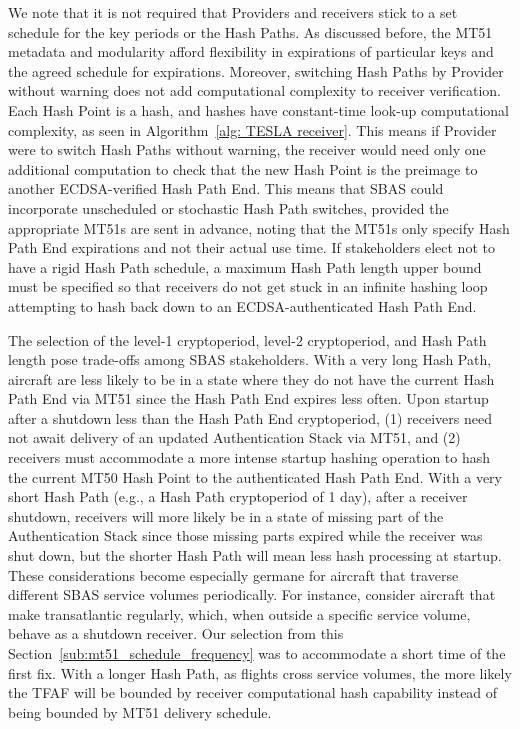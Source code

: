 \documentclass[letterpaper,times]{IONconf/IONconf}
\begin{document}
		We note that it is not required that Providers and receivers stick to a set schedule for the key periods or the Hash Paths.
		As discussed before, the MT51 metadata and modularity afford flexibility in expirations of particular keys and the agreed schedule for expirations.
		Moreover, switching Hash Paths by Provider without warning does not add computational complexity to receiver verification.
		Each Hash Point is a hash, and hashes have constant-time look-up computational complexity, as seen in Algorithm~\ref{alg: TESLA receiver}.
		This means if Provider were to switch Hash Paths without warning, the receiver would need only one additional computation to check that the new Hash Point is the preimage to another ECDSA-verified Hash Path End.
		This means that SBAS could incorporate unscheduled or stochastic Hash Path switches, provided the appropriate MT51s are sent in advance, noting that the MT51s only specify Hash Path End expirations and not their actual use time.
		If stakeholders elect not to have a rigid Hash Path schedule, a maximum Hash Path length upper bound must be specified so that receivers do not get stuck in an infinite hashing loop attempting to hash back down to an ECDSA-authenticated Hash Path End.

		The selection of the level-1 cryptoperiod, level-2 cryptoperiod, and Hash Path length pose trade-offs among SBAS stakeholders.
		With a very long Hash Path, aircraft are less likely to be in a state where they do not have the current Hash Path End via MT51 since the Hash Path End expires less often.
		Upon startup after a shutdown less than the Hash Path End cryptoperiod, (1) receivers need not await delivery of an updated Authentication Stack via MT51, and (2) receivers must accommodate a more intense startup hashing operation to hash the current MT50 Hash Point to the authenticated Hash Path End.
		With a very short Hash Path (e.g., a Hash Path cryptoperiod of 1 day), after a receiver shutdown, receivers will more likely be in a state of missing part of the Authentication Stack since those missing parts expired while the receiver was shut down, but the shorter Hash Path will mean less hash processing at startup.
		These considerations become especially germane for aircraft that traverse different SBAS service volumes periodically.
		For instance, consider aircraft that make transatlantic regularly, which, when outside a specific service volume, behave as a shutdown receiver.
		Our selection from this Section~\ref{sub:mt51_schedule_frequency} was to accommodate a short time of the first fix.
		With a longer Hash Path, as flights cross service volumes, the more likely the TFAF will be bounded by receiver computational hash capability instead of being bounded by MT51 delivery schedule.
\end{document}
